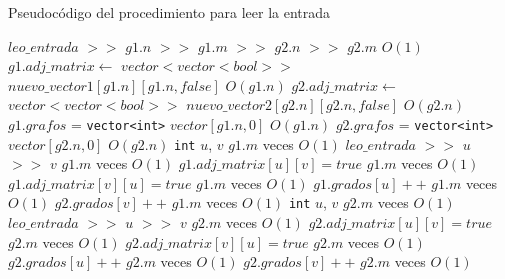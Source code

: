 \begin{algorithm}[H]
  \begin{algorithmic}[1]
  \caption{Pseudocódigo del procedimiento para leer la entrada}
  \label{algo:ap-2}
    \State $leo\_entrada$ $>>$ $g1.n$ $>>$ $g1.m$ $>>$ $g2.n$ $>>$ $g2.m$
    \Comment $O(1)$
    	\State $g1.adj\_matrix \gets$ \texttt{$vector<vector<bool>>$} $nuevo\_vector1[g1.n][g1.n,false]$
    \Comment $O(g1.n)$
    	\State $g2.adj\_matrix \gets$ \texttt{$vector<vector<bool>>$} $nuevo\_vector2[g2.n][g2.n,false]$
    \Comment $O(g2.n)$
    \State $g1.grafos$ = \texttt{vector<int>} $vector[g1.n,0]$
    \Comment $O(g1.n)$
    \State $g2.grafos$ = \texttt{vector<int>} $vector[g2.n,0]$
    \Comment $O(g2.n)$
         \State \texttt{int} $u$, $v$
		 \Comment $g1.m$ veces $O(1)$ 
         \State $leo\_entrada$ $>>$ $u$ $>>$ $v$
		 \Comment $g1.m$ veces $O(1)$ 
		 \State $g1.adj\_matrix[u][v] = true$
		 \Comment $g1.m$ veces $O(1)$ 		 
		 \State $g1.adj\_matrix[v][u] = true$
		 \Comment $g1.m$ veces $O(1)$ 
		 \State $g1.grados[u]++$
		 \Comment $g1.m$ veces $O(1)$ 
		 \State $g2.grados[v]++$
		 \Comment $g1.m$ veces $O(1)$ 
    \EndFor
         \State \texttt{int} $u$, $v$
		 \Comment $g2.m$ veces $O(1)$ 
         \State $leo\_entrada$ $>>$ $u$ $>>$ $v$
		 \Comment $g2.m$ veces $O(1)$ 
		 \State $g2.adj\_matrix[u][v] = true$
		 \Comment $g2.m$ veces $O(1)$ 
		 \State $g2.adj\_matrix[v][u] = true$
		 \Comment $g2.m$ veces $O(1)$ 
		 \State $g2.grados[u]++$
		 \Comment $g2.m$ veces $O(1)$ 
		 \State $g2.grados[v]++$
		 \Comment $g2.m$ veces $O(1)$ 
    \EndFor
		\EndProcedure
	\end{algorithmic}
\end{algorithm}


